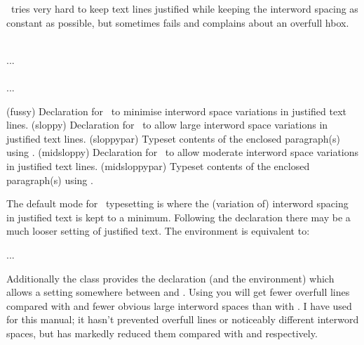 

    \tx\ tries very hard to keep text lines justified while keeping the 
interword spacing as constant as possible, but sometimes fails and complains
about an overfull hbox.

\begin{syntax}
\cmd{\fussy} \cmd{\sloppy} \\
 ...  \\
\cmd{\midsloppy} \\
 ...  \\
\end{syntax}
\glossary(fussy)%
  {}%
  {Declaration for \tx\ to minimise interword space variations in justified text lines.}
\glossary(sloppy)%
  {}%
  {Declaration for \tx\ to allow large interword space variations in justified 
   text lines.}%
\glossary(sloppypar)%
  {}%
  {Typeset contents of the enclosed paragraph(s) using .}%
\glossary(midsloppy)%
  {}%
  {Declaration for \tx\ to allow moderate interword space variations in justified 
   text lines.}%
\glossary(midsloppypar)%
  {}%
  {Typeset contents of the enclosed paragraph(s) using .}%

    The default mode for \ltx\ typesetting is \cmd{\fussy} where 
the (variation of) interword spacing in justified text is kept to a 
minimum. Following the \cmd{\sloppy}
declaration there may be a much looser setting of justified text. 
The  environment is equivalent to:
\begin{lcode}
{\par \sloppy ... \par}
\end{lcode}

    Additionally the class provides the \cmd{\midsloppy} declaration (and the
 environment) which allows a setting somewhere between 
\cmd{\fussy} and \cmd{\sloppy}. Using \cmd{\midsloppy} you will get fewer 
overfull lines compared with \cmd{\fussy} and fewer obvious large 
interword spaces than with \cmd{\sloppy}.
I have used \cmd{\midsloppy} for this manual; it hasn't prevented 
overfull lines or noticeably different interword spaces, but has markedly 
reduced them compared with \cmd{\fussy} and \cmd{\sloppy} respectively.


